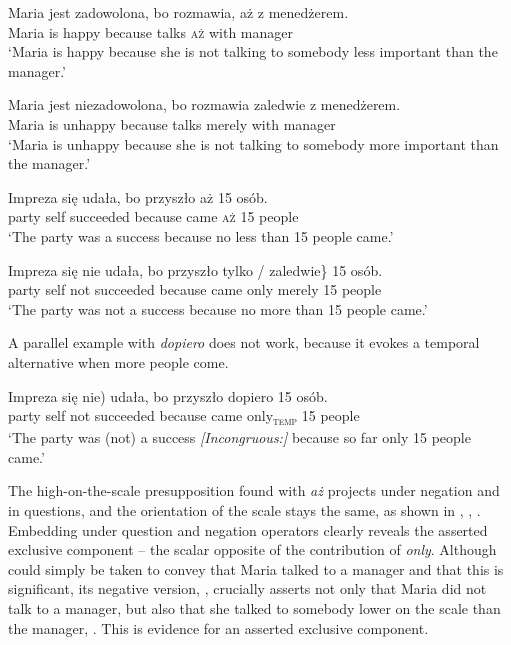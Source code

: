 \documentclass[output=paper,colorlinks,citecolor=brown]{langscibook}
\begin{document}
\ea\label{ex:tom:64}
\gll Maria jest zadowolona, bo rozmawia, aż z menedżerem.\\
Maria is happy because talks \textsc{aż} with manager\\
\glt `Maria is happy because she is not talking to somebody less important than the manager.’\\
\z 

\ea\label{ex:tom:65}
\gll Maria jest niezadowolona, bo rozmawia zaledwie z menedżerem.\\
Maria is unhappy because talks merely with manager\\
\glt `Maria is unhappy because she is not talking to somebody more important than the manager.’\\
\z 

\ea\label{ex:tom:66}
\gll Impreza się udała, bo przyszło aż 15 osób.\\
party self succeeded because came \textsc{aż} 15 people\\
\glt `The party was a success because no less than 15 people came.’\\
\z 

\ea\label{ex:tom:67}
\gll Impreza się nie udała, bo  przyszło \minsp{\{} tylko / zaledwie\} 15 osób.\\
party self not succeeded because came {} only {} merely 15 people\\
\glt `The party was not a success because no more than 15 people came.’\\
\z 

\noindent A parallel example with \textit{dopiero} does not work, because it evokes a temporal alternative when more people come.

\ea\label{ex:tom:party-dopiero}   
\gll Impreza się \minsp{(} nie) udała, \minsp{\#} bo przyszło dopiero 15 osób.\\
party self {} not succeeded {} because came only\textsubscript{\textsc{temp}} 15 people\\
\glt `The party was (not) a success \textit{[Incongruous:]} because so far only 15 people came.’
\z 

\noindent The high-on-the-scale presupposition found with \textit{aż} projects under negation and in questions, and the orientation of the scale stays the same, as shown in , , . Embedding under question and negation operators clearly reveals the asserted exclusive component -- the scalar opposite of the contribution of \textit{only}. Although  could simply be taken to convey that Maria talked to a manager and that this is significant, its negative version, , crucially asserts not only that Maria did not talk to a manager, but also that she talked to somebody lower on the scale than the manager, . This is evidence for an asserted exclusive component.
\end{document}
